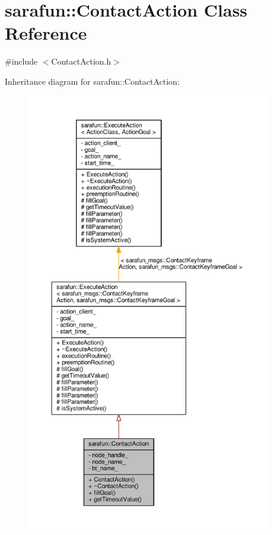 \hypertarget{classsarafun_1_1ContactAction}{\section{sarafun\-:\-:Contact\-Action Class Reference}
\label{classsarafun_1_1ContactAction}
}


{\ttfamily \#include $<$Contact\-Action.\-h$>$}



Inheritance diagram for sarafun\-:\-:Contact\-Action\-:\nopagebreak
\begin{figure}[H]
\begin{center}
\leavevmode
\includegraphics[height=550pt]{d8/d33/classsarafun_1_1ContactAction__inherit__graph}
\end{center}
\end{figure}


